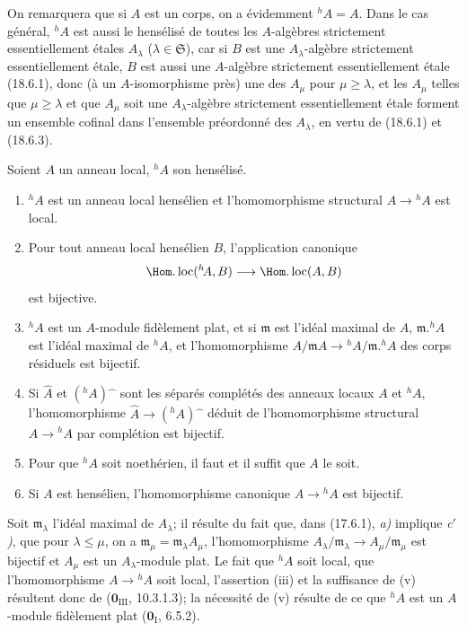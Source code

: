 On remarquera que si $A$ est un corps, on a évidemment ${}^h\!A=A$. Dans le cas général, ${}^h\!A$ est aussi le hensélisé de toutes les $A$-algèbres strictement essentiellement étales $A_\lambda$ ($\lambda\in\mathfrak S$), car si $B$ est une $A_\lambda$-algèbre strictement essentiellement étale, $B$ est aussi une $A$-algèbre strictement essentiellement étale (18.6.1), donc (à un $A$-isomorphisme près) une des $A_\mu$ pour $\mu\geq\lambda$, et les $A_\mu$ telles que $\mu\geq\lambda$ et que $A_\mu$ soit une $A_\lambda$-algèbre strictement essentiellement étale forment un ensemble cofinal dans l'ensemble préordonné des $A_\lambda$, en vertu de (18.6.1) et (18.6.3).

\begin{theorem}[18.6.6]
\label{IV.18.6.6}
Soient $A$ un anneau local, ${}^h\!A$ son hensélisé.
\begin{enumerate}
  \item[\textup{(i)}] ${}^h\!A$ est un anneau local hensélien et l'homomorphisme structural $A\to{}^h\!A$ est local.
  \item[\textup{(ii)}] Pour tout anneau local hensélien $B$, l'application canonique
  \[
    \Hom.\operatorname{loc}({}^h\!A,B)\longrightarrow\Hom.\operatorname{loc}(A,B)
  \]
  est bijective.
  \item[\textup{(iii)}] ${}^h\!A$ est un $A$-module fidèlement plat, et si $\mathfrak m$ est l'idéal maximal de $A$, $\mathfrak m.{}^h\!A$ est l'idéal maximal de ${}^h\!A$, et l'homomorphisme $A/\mathfrak mA\to{}^h\!A/\mathfrak m.{}^h\!A$ des corps résiduels est bijectif.
  \item[\textup{(iv)}] Si $\widehat A$ et $({}^h\!A)\widehat{\phantom{x}}$ sont les séparés complétés des anneaux locaux $A$ et ${}^h\!A$, l'homomorphisme $\widehat A\to({}^h\!A)\widehat{\phantom{x}}$ déduit de l'homomorphisme structural $A\to{}^h\!A$ par complétion est bijectif.
  \item[\textup{(v)}] Pour que ${}^h\!A$ soit noethérien, il faut et il suffit que $A$ le soit.
  \item[\textup{(vi)}] Si $A$ est hensélien, l'homomorphisme canonique $A\to{}^h\!A$ est bijectif.
\end{enumerate}
\end{theorem}


Soit $\mathfrak m_\lambda$ l'idéal maximal de $A_\lambda$; il résulte du fait que, dans (17.6.1), \emph{a)} implique \emph{c$'$)}, que pour $\lambda\leq\mu$, on a $\mathfrak m_\mu=\mathfrak m_\lambda A_\mu$, l'homomorphisme $A_\lambda/\mathfrak m_\lambda\to A_\mu/\mathfrak m_\mu$ est bijectif et $A_\mu$ est un $A_\lambda$-module plat. Le fait que ${}^h\!A$ soit local, que l'homomorphisme $A\to{}^h\!A$ soit local, l'assertion (iii) et la suffisance de (v) résultent donc de ($\mathbf{0}_{\mathrm{III}}$, 10.3.1.3); la nécessité de (v) résulte de ce que ${}^h\!A$ est un $A$-module fidèlement plat ($\mathbf{0}_{\mathrm I}$, 6.5.2).

